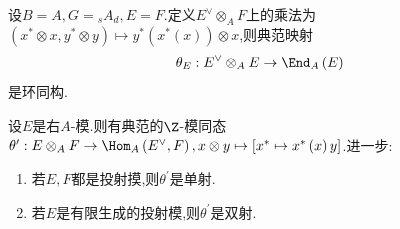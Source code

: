 \begin{proposition}{}{}
	设$B=A,G={}_{s}A_{d},E=F$.定义$E^{\vee}\otimes_{A}F$上的乘法为$\left(x^{\ast}\otimes x,y^{\ast}\otimes y\right)\mapsto y^{\ast}\left(x^{\ast}\left(x\right)\right)\otimes x$,则典范映射
	\begin{align*}
		\theta_{E}:E^{\vee}\otimes_{A}E\to\End_{A}\left(E\right)
	\end{align*}
	是环同构.
\end{proposition}

\begin{remark}{}{}
	设$E$是右$A$-模.则有典范的$\Z$-模同态$\theta^{\prime}:E\otimes_{A}F\to\Hom_{A}\left(E^{\vee},F\right),x\otimes y\mapsto\left[x^{\ast}\mapsto x^{\ast}\left(x\right)y\right]$.进一步:
	\begin{enumerate}
		\item 若$E,F$都是投射摸,则$\theta^{\prime}$是单射.
		\item 若$E$是有限生成的投射模,则$\theta^{\prime}$是双射.
	\end{enumerate}
\end{remark}




